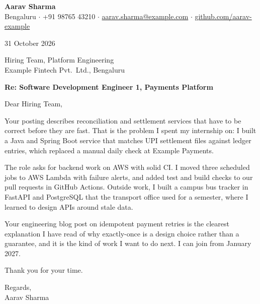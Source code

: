 \documentclass[11pt,a4paper]{article}
\begin{document}
{\Large\bfseries\color{accent} Aarav Sharma}\\
Bengaluru $\cdot$ +91 98765 43210 $\cdot$ \href{mailto:aarav.sharma@example.com}{aarav.sharma@example.com} $\cdot$ \href{https://github.com/aarav-example}{github.com/aarav-example}

31 October 2026

Hiring Team, Platform Engineering\\
Example Fintech Pvt.\ Ltd., Bengaluru

\textbf{Re: Software Development Engineer 1, Payments Platform}

Dear Hiring Team,

Your posting describes reconciliation and settlement services that have to be correct before they are fast. That is the problem I spent my internship on: I built a Java and Spring Boot service that matches UPI settlement files against ledger entries, which replaced a manual daily check at Example Payments.

The role asks for backend work on AWS with solid CI. I moved three scheduled jobs to AWS Lambda with failure alerts, and added test and build checks to our pull requests in GitHub Actions. Outside work, I built a campus bus tracker in FastAPI and PostgreSQL that the transport office used for a semester, where I learned to design APIs around stale data.

Your engineering blog post on idempotent payment retries is the clearest explanation I have read of why exactly-once is a design choice rather than a guarantee, and it is the kind of work I want to do next. I can join from January 2027.

Thank you for your time.

Regards,\\
Aarav Sharma
\end{document}
